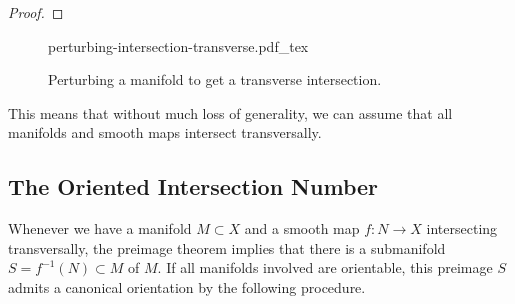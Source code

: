 \begin{proof}
\end{proof}

%
%

	\begin{figure}[ht]
		\centering
		{perturbing-intersection-transverse.pdf_tex}
		\medskip
		\caption{Perturbing a manifold to get a transverse intersection.}\label{fig:perturbing-intersections-transverse}
	\end{figure}
This means that without much loss of generality, we can assume that all manifolds and smooth maps intersect transversally.

\subsection*{The Oriented Intersection Number}

Whenever we have a manifold $M\subset X$ and a smooth map $f : N \to X$ intersecting transversally, the preimage theorem implies that there is a submanifold $S = f^{-1}(N)\subset M$ of $M$. 
If all manifolds involved are orientable, this preimage $S$ admits a canonical orientation by the following procedure. 

